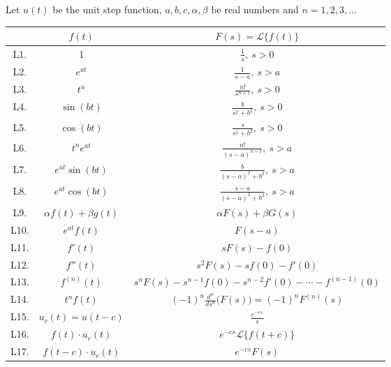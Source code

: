 \documentclass[12pt]{article}
\newcommand{\ds}{\displaystyle}
\renewcommand{\L}{\mathscr{L}}
\begin{document}
\begin{center}
    Let \(u(t)\) be the unit step function, \(a, b, c, \alpha, \beta\) be real numbers and \(n = 1, 2, 3, ...\)

    \begin{tabular}{|c|c|c|}
        \hline
        & $f(t)$                        
        & $F(s) = \L\{ f(t) \}$ \\
        \hline
        \hline
        L1.	& 1                             & $\ds \frac{1}{s},\ s>0$\\
        \hline
        L2.	& $e^{at}$                      & $\ds \frac{1}{s-a},\ s>a$\\
        \hline
        L3.	& $t^n$                         & $\ds \frac{n!}{s^{n+1}},\ s>0$\\
        \hline
        L4.	& $\sin (bt)$                   & $\ds \frac{b}{s^2 + b^2},\ s>0$\\
        \hline
        L5.	& $\cos(bt)$                    & $\ds \frac{s}{s^2 + b^2},\ s>0$\\
        \hline
        L6.	& $t^n e^{at}$                  & $\ds \frac{n!}{(s-a)^{n+1}},\ s>a$\\
        \hline
        L7.	& $e^{at} \sin(bt)$             & $\ds \frac{b}{(s-a)^2 + b^2},\ s>a$\\
        \hline
        L8.	& $e^{at} \cos(bt)$             & $\ds \frac{s-a}{(s-a)^2 + b^2},\ s>a$\\
        \hline
        L9.	& $\alpha f(t) + \beta g(t)$    & $\ds \alpha F(s) + \beta G(s)$\\
        \hline
        L10.	& $e^{at}f(t)$              & $F(s-a)$\\
        \hline
        L11.	& $f'(t)$                   & $sF(s) - f(0)$\\
        \hline
        L12.	& $f''(t)$                  & $s^2 F(s) - sf(0) - f'(0)$\\
        \hline
        L13.	& $f^{(n)}(t)$              & $s^n F(s) - s^{n-1}f(0) - s^{n-2}f'(0) - \cdots - f^{(n-1)}(0)$\\
        \hline
        L14.	& $t^n f(t)$                & $\ds (-1)^n\frac{d^n}{ds^n}\big( F(s) \big) = (-1)^nF^{(n)}(s)$\\
        \hline
        L15.	& $u_c(t) = u(t-c)$         & $\ds  \frac{e^{-cs}}{s}$\\
        \hline
        L16.	& $\ds f(t)\cdot u_c(t)$    & $\ds e^{-cs} \L\{ f(t+c) \}$\\
        \hline
        L17.	& $\ds f(t-c)\cdot u_c(t)$  & $\ds e^{-cs}F(s)$\\
        \hline
        \hline
    \end{tabular}
\end{center}
\end{document}

